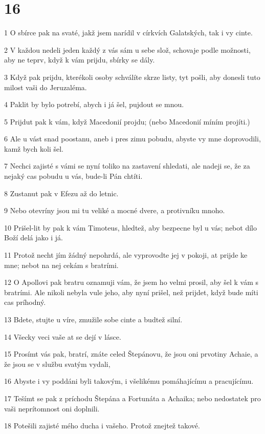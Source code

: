 \chapter{16}

\par 1 O sbírce pak na svaté, jakž jsem narídil v církvích Galatských, tak i vy cinte.
\par 2 V každou nedeli jeden každý z vás sám u sebe slož, schovaje podle možnosti, aby ne teprv, když k vám prijdu, sbírky se dály.
\par 3 Když pak prijdu, kterékoli osoby schválíte skrze listy, tyt pošli, aby donesli tuto milost vaši do Jeruzaléma.
\par 4 Paklit by bylo potrebí, abych i já šel, pujdout se mnou.
\par 5 Prijdut pak k vám, když Macedonií projdu; (nebo Macedonií míním projíti.)
\par 6 Ale u vást snad poostanu, aneb i pres zimu pobudu, abyste vy mne doprovodili, kamž bych koli šel.
\par 7 Nechci zajisté s vámi se nyní toliko na zastavení shledati, ale nadeji se, že za nejaký cas pobudu u vás, bude-li Pán chtíti.
\par 8 Zustanut pak v Efezu až do letnic.
\par 9 Nebo otevríny jsou mi tu veliké a mocné dvere, a protivníku mnoho.
\par 10 Prišel-lit by pak k vám Timoteus, hledtež, aby bezpecne byl u vás; nebot dílo Boží delá jako i já.
\par 11 Protož necht jím žádný nepohrdá, ale vyprovodte jej v pokoji, at prijde ke mne; nebot na nej cekám s bratrími.
\par 12 O Apollovi pak bratru oznamuji vám, že jsem ho velmi prosil, aby šel k vám s bratrími. Ale nikoli nebyla vule jeho, aby nyní prišel, než prijdet, když bude míti cas príhodný.
\par 13 Bdete, stujte u víre, zmužile sobe cinte a budtež silní.
\par 14 Všecky veci vaše at se dejí v lásce.
\par 15 Prosímt vás pak, bratrí, znáte celed Štepánovu, že jsou oni prvotiny Achaie, a že jsou se v službu svatým vydali,
\par 16 Abyste i vy poddáni byli takovým, i všelikému pomáhajícímu a pracujícímu.
\par 17 Tešímt se pak z príchodu Štepána a Fortunáta a Achaika; nebo nedostatek pro vaši neprítomnost oni doplnili.
\par 18 Potešili zajisté mého ducha i vašeho. Protož znejtež takové.
